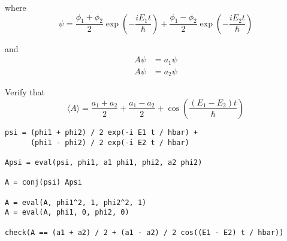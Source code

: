 \begin{enumerate}
where
\begin{equation*}
\psi
=\frac{\phi_1+\phi_2}{2}\exp\left(-\frac{iE_1t}{\hbar}\right)
+\frac{\phi_1-\phi_2}{2}\exp\left(-\frac{iE_2t}{\hbar}\right)
\end{equation*}

and
\begin{align*}
A\psi&=a_1\psi
\\
A\psi&=a_2\psi
\end{align*}

Verify that
\begin{equation*}
\langle A\rangle
=\frac{a_1+a_2}{2}+\frac{a_1-a_2}{2}+\cos\left(\frac{(E_1-E_2)t}{\hbar}\right)
\end{equation*}

\begin{verbatim}
psi = (phi1 + phi2) / 2 exp(-i E1 t / hbar) +
      (phi1 - phi2) / 2 exp(-i E2 t / hbar)

Apsi = eval(psi, phi1, a1 phi1, phi2, a2 phi2)

A = conj(psi) Apsi

A = eval(A, phi1^2, 1, phi2^2, 1)
A = eval(A, phi1, 0, phi2, 0)

check(A == (a1 + a2) / 2 + (a1 - a2) / 2 cos((E1 - E2) t / hbar))
\end{verbatim}

\end{enumerate}

